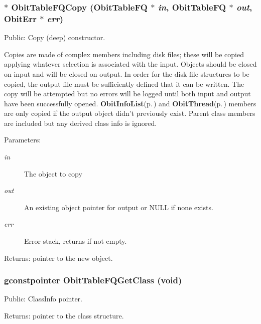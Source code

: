 \subsubsection{$\ast$ Obit\-Table\-FQCopy ({\bf Obit\-Table\-FQ} $\ast$ {\em in}, {\bf Obit\-Table\-FQ} $\ast$ {\em out}, {\bf Obit\-Err} $\ast$ {\em err})}\label{ObitTableFQ_8c_a20}


Public: Copy (deep) constructor. 

Copies are made of complex members including disk files; these will be copied applying whatever selection is associated with the input. Objects should be closed on input and will be closed on output. In order for the disk file structures to be copied, the output file must be sufficiently defined that it can be written. The copy will be attempted but no errors will be logged until both input and output have been successfully opened. {\bf Obit\-Info\-List}{\rm (p.\,\pageref{structObitInfoList})} and {\bf Obit\-Thread}{\rm (p.\,\pageref{structObitThread})} members are only copied if the output object didn't previously exist. Parent class members are included but any derived class info is ignored. \begin{Desc}
\item[Parameters:]
\begin{description}
\item[{\em in}]The object to copy \item[{\em out}]An existing object pointer for output or NULL if none exists. \item[{\em err}]Error stack, returns if not empty. \end{description}
\end{Desc}
\begin{Desc}
\item[Returns:]pointer to the new object. \end{Desc}
\subsubsection{\setlength{\rightskip}{0pt plus 5cm}gconstpointer Obit\-Table\-FQGet\-Class (void)}\label{ObitTableFQ_8c_a17}


Public: Class\-Info pointer. 

\begin{Desc}
\item[Returns:]pointer to the class structure. \end{Desc}
